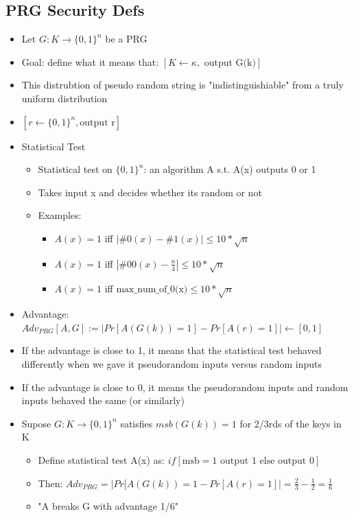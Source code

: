 \documentclass[]{article}
\begin{document}
\subsection{PRG Security Defs}
\begin{itemize}
	\item Let $G:K \rightarrow \{0,1\}^{n}$ be a PRG
	\item Goal: define what it means that: $[K \leftarrow \kappa, \text{ output G(k)}]$
	\item This distrubtion of pseudo random string is "indistinguishiable" from a truly uniform distribution
	\item $[r \leftarrow \{0,1\}^{n}, \text{output r}]$
	\item Statistical Test
	\begin{itemize}
		\item Statistical test on $\{0,1\}^{n}$: an algorithm A s.t. A(x) outputs 0 or 1
		\item Takes input x and decides whether its random or not
		\item Examples: 
		\begin{itemize}
			\item $A(x) = 1 $ iff $|\#0(x) - \#1(x)| \leq 10 * \sqrt{n}$
			\item $A(x) = 1 $ iff $|\#00(x) - \frac{n}{4}| \leq 10 * \sqrt{n}$
			\item $A(x) = 1 $ iff $\text{max\_num\_of\_0(x)} \leq 10 * \sqrt{n}$
		\end{itemize}
	\end{itemize}
	\item Advantage: $Adv_{PRG}[A,G] := |Pr[A(G(k)) = 1] - Pr[A(r) = 1]| \leftarrow [0,1]$
	\item If the advantage is close to 1, it means that the statistical test behaved differently when we gave it pseudorandom inputs versus random inputs
	\item If the advantage is close to 0, it means the pseudorandom inputs and random inputs behaved the same (or similarly)
	\item Supose $G:K \rightarrow \{0,1\}^{n}$ satisfies $msb(G(k)) = 1$ for 2/3rds of the keys in K
	\begin{itemize}
		\item Define statistical test A(x) as: $if [\text{msb} = 1 \text{ output 1 else output 0}]$
		\item Then: $Adv_{PRG} = |Pr[A(G(k)) = 1 - Pr[A(r) = 1]| = \frac{2}{3} - \frac{1}{2} = \frac{1}{6}$
		\item "A breaks G with advantage 1/6"

\end{itemize}
\end{itemize}
\end{document}
